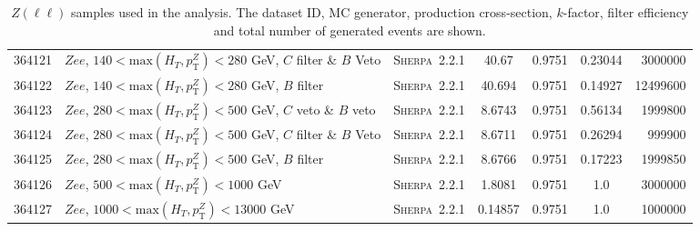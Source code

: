 \begin{table}[!htb]
{\begin{tabular}{|c|l|c|c|c|c|r|}
      364121 & $Z ee $, $140<\text{max}(H_T,p_{\text{T}}^Z)<280$ GeV, $C$ filter \& $B$ Veto & \textsc{Sherpa}~2.2.1 &   40.67             & 0.9751& 0.23044 &    3000000\\
      364122 & $Z ee $, $140<\text{max}(H_T,p_{\text{T}}^Z)<280$ GeV, $B$ filter & \textsc{Sherpa}~2.2.1 &               40.694            & 0.9751& 0.14927 &   12499600\\
      364123 & $Z ee $, $280<\text{max}(H_T,p_{\text{T}}^Z)<500$ GeV, $C$ veto \& $B$ veto & \textsc{Sherpa}~2.2.1 &     8.6743            & 0.9751& 0.56134 &    1999800\\
      364124 & $Z ee $, $280<\text{max}(H_T,p_{\text{T}}^Z)<500$ GeV, $C$ filter \& $B$ Veto & \textsc{Sherpa}~2.2.1 &   8.6711            & 0.9751& 0.26294 &    999900 \\
      364125 & $Z ee $, $280<\text{max}(H_T,p_{\text{T}}^Z)<500$ GeV, $B$ filter & \textsc{Sherpa}~2.2.1 &               8.6766            & 0.9751& 0.17223 &   1999850 \\
      364126 & $Z ee $, $500<\text{max}(H_T,p_{\text{T}}^Z)<1000$ GeV                      & \textsc{Sherpa}~2.2.1 &     1.8081            & 0.9751& 1.0 	&   3000000 \\
      364127 & $Z ee $, $1000<\text{max}(H_T,p_{\text{T}}^Z)<13000$ GeV                      & \textsc{Sherpa}~2.2.1 &   0.14857           & 0.9751& 1.0 	&   1000000 \\
      \hline
      \hline
    \end{tabular}
    \caption{$Z(\ell\ell)$ samples used in the analysis. The dataset ID, MC
      generator, production cross-section, $k$-factor, filter efficiency and
      total number of generated events are shown.}
    \label{tabular:mc_samples_Zlljets}
}
\end{table}